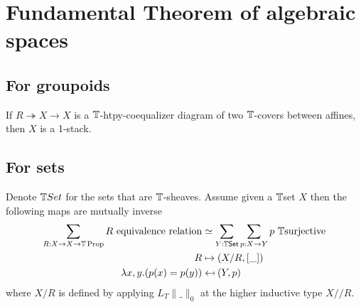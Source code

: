\section{Fundamental Theorem of algebraic spaces}
\subsection{For groupoids}
\begin{lemma}
	If $R \twoheadrightarrow X \to X$ is a $\mathbb{T}$-htpy-coequalizer diagram of two $\mathbb{T}$-covers between affines, then $X$ is a  1-stack.
\end{lemma}

\subsection{For sets}
\begin{lemma}\label{quotient-by-equivalence-relation}
	Denote $\mathbb{T} Set$ for the sets that are $\mathbb{T}$-sheaves. Assume given a $\mathbb{T}$set  $X$ then the following maps are mutually inverse
	\begin{align*}
		\sum_{R:X\to X\to \bT\Prop} R\ \mathrm{equivalence\ relation} &\simeq \sum_{Y:\bT \mathrm{\Set}} \sum_{p:X\to Y} p\ \bT\mathrm{surjective} \\
		R &\mapsto (X/R,[\_]) \\
		\lambda x,y.  (p(x)=p(y)) &\mapsfrom (Y,p) 
	\end{align*}
	where $X / R$ is defined by applying $L_T \| \_ \|_0 $ at the higher inductive type $X // R$.
\end{lemma}

